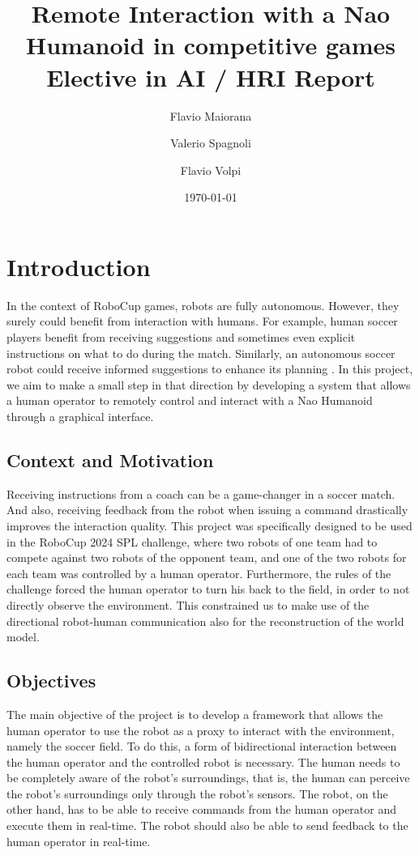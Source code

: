 \documentclass[a4paper, onecolumn, 12pt]{article}
\title{Remote Interaction with a Nao Humanoid in competitive games \\ Elective in AI / HRI Report}
\author{Flavio Maiorana \and Valerio Spagnoli \and Flavio Volpi}
\date{\today}
\begin{document}
\maketitle

\section{Introduction}
\label{sec:intro}

In the context of RoboCup games, robots are fully autonomous. However, they
surely could benefit from interaction with humans. For example, human soccer
players benefit from receiving suggestions and sometimes even explicit
instructions on what to do during the match. Similarly, an autonomous soccer
robot could receive informed suggestions to enhance its planning
. In this project, we aim to make a
small step in that direction by developing a system that allows a human operator
to remotely control and interact with a Nao Humanoid through a graphical
interface. 

\subsection{Context and Motivation}
\label{sec:context}

Receiving instructions from a coach can be a game-changer in a soccer match. And
also, receiving feedback from the robot when issuing a command drastically
improves the interaction quality. This project was specifically designed to be
used in the RoboCup 2024 SPL challenge, where two robots of one team had to
compete against two robots of the opponent team, and one of the two robots for
each team was controlled by a human operator. Furthermore, the rules of the
challenge forced the human operator to turn his back to the field, in order to
not directly observe the environment. This constrained us to make use of the
directional robot-human communication also for the reconstruction of the world
model.


\subsection{Objectives}
\label{sec:obj}

The main objective of the project is to develop a framework that allows the human operator
to use the robot as a proxy to interact with the environment, namely the soccer
field. To do this, a form of bidirectional interaction between the human operator 
and the controlled robot is necessary. The human needs
to be completely aware of the robot's surroundings, that is, the human can
perceive the robot's surroundings only through the robot's sensors. The robot,
on the other hand, has to be able to receive commands from the human operator
and execute them in real-time. The robot should also be able to send feedback to
the human operator in real-time. 
\end{document}
